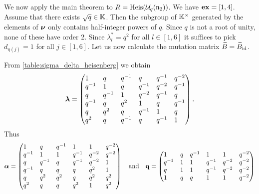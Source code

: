 \begin{example}

	We now apply the main theorem to $R = \operatorname{Heis}(\mathcal{U}_q(\mathfrak{n}_2))$. We have $\mathbf{ex} = [1,4]$. Assume that
	there exists $\sqrt{q} \in \mathbb{K}$. Then the subgroup of $\mathbb{K}^\times$ generated by the
	elements of $\boldsymbol{\nu}$ only contains half-integer powers of $q$. Since $q$ is not a root of
	unity, none of these have order 2. Since $\lambda_l^* = q^2$ for all $l \in [1, 6]$ it
	suffices to pick $d_{\eta(j)} = 1$ for all $j \in [1, 6]$. Let us now calculate the
	mutation matrix $\widetilde{B} = \widetilde{B}_{\operatorname{id}}$.

	From \cref{table:sigma_delta_heisenberg} we obtain
	\begin{equation*}
		\bbl = \begin{pmatrix*}[l]
			1     & q     & q\inv & q      & q\inv  & q^{-2} \\
			q\inv & 1     & q     & q\inv  & q^{-2} & q\inv  \\
			q     & q\inv & 1     & q^{-2} & q\inv  & q      \\
			q\inv & q     & q^2   & 1      & q      & q\inv  \\
			q     & q^2   & q     & q\inv  & 1      & q      \\
			q^2   & q     & q\inv & q      & q\inv  & 1
		\end{pmatrix*}.
	\end{equation*}
	Thus
	\begin{equation*}
		\boldsymbol{\alpha} = \begin{pmatrix*}[l]
			1     & q     & q\inv & 1      & 1      & q^{-2} \\
			q\inv & 1     & 1     & q\inv  & q^{-2} & q^{-2} \\
			q     & q\inv & q     & q^{-1} & q^{-2} & 1      \\
			q\inv & q     & q     & q      & q^2    & 1      \\
			q     & q^2   & q^2   & q      & q^2    & q^2    \\
			q^2   & q     & q     & q^2    & 1      & q^2
		\end{pmatrix*}
		\quad \text{and}\quad \bbq = \begin{pmatrix*}[l]
			1     & q   & q\inv & 1      & 1      & q^{-2} \\
			q\inv & 1   & 1     & q\inv  & q^{-2} & q^{-2} \\
			q     & 1   & 1     & q^{-1} & q^{-2} & q^{-2} \\
			1     & q   & q     & 1      & 1      & q^{-2} \\

\end{pmatrix*}
\end{equation*}
\end{example}
